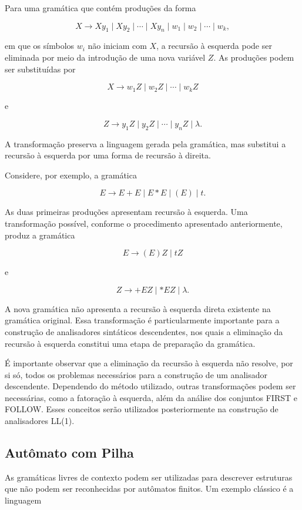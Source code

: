 \documentclass[
  brazilian,
  letterpaper,
]{book}
\theoremstyle{plain}
\theoremstyle{definition}
\theoremstyle{remark}
\begin{document}
Para uma gramática que contém produções da forma

\[
X \rightarrow Xy_1 \mid Xy_2 \mid \cdots \mid Xy_n
       \mid w_1 \mid w_2 \mid \cdots \mid w_k,
\]

em que os símbolos \(w_i\) não iniciam com \(X\), a recursão à esquerda
pode ser eliminada por meio da introdução de uma nova variável \(Z\). As
produções podem ser substituídas por

\[
X \rightarrow w_1Z \mid w_2Z \mid \cdots \mid w_kZ
\]

e

\[
Z \rightarrow y_1Z \mid y_2Z \mid \cdots \mid y_nZ \mid \lambda.
\]

A transformação preserva a linguagem gerada pela gramática, mas
substitui a recursão à esquerda por uma forma de recursão à direita.

Considere, por exemplo, a gramática

\[
E \rightarrow E+E \mid E*E \mid (E) \mid t.
\]

As duas primeiras produções apresentam recursão à esquerda. Uma
transformação possível, conforme o procedimento apresentado
anteriormente, produz a gramática

\[
E \rightarrow (E)Z \mid tZ
\]

e

\[
Z \rightarrow +EZ \mid *EZ \mid \lambda.
\]

A nova gramática não apresenta a recursão à esquerda direta existente na
gramática original. Essa transformação é particularmente importante para
a construção de analisadores sintáticos descendentes, nos quais a
eliminação da recursão à esquerda constitui uma etapa de preparação da
gramática.

É importante observar que a eliminação da recursão à esquerda não
resolve, por si só, todos os problemas necessários para a construção de
um analisador descendente. Dependendo do método utilizado, outras
transformações podem ser necessárias, como a fatoração à esquerda, além
da análise dos conjuntos FIRST e FOLLOW. Esses conceitos serão
utilizados posteriormente na construção de analisadores LL(1).

\subsection{Autômato com Pilha}\label{autuxf4mato-com-pilha}

As gramáticas livres de contexto podem ser utilizadas para descrever
estruturas que não podem ser reconhecidas por autômatos finitos. Um
exemplo clássico é a linguagem
\end{document}

